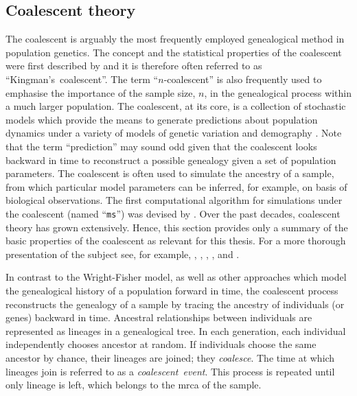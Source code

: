 %
\subsection{Coalescent theory}
\label{sec:coalescent}
%


The coalescent is arguably the most frequently employed genealogical method in population genetics.
The concept and the statistical properties of the coalescent were first described by \citet{Kingman:1982x,Kingman:1982gu,Kingman:1982uj} and it is therefore often referred to as ``Kingman's~coalescent''.
The term ``$n$-coalescent'' is also frequently used to emphasise the importance of the sample size, $n$, in the genealogical process within a much larger population.
The coalescent, at its core, is a collection of stochastic models which provide the means to generate predictions about population dynamics under a variety of models of genetic variation and demography \citep{wakeley2008}.
Note that the term ``prediction'' may sound odd given that the coalescent looks backward in time to reconstruct a possible genealogy given a set of population parameters.
The coalescent is often used to simulate the ancestry of a sample, from which particular model parameters can be inferred, for example, on basis of biological observations.
The first computational algorithm for simulations under the coalescent (named ``\texttt{ms}'') was devised by \citet{Hudson:1990vob}.
Over the past decades, coalescent theory has grown extensively.
Hence, this section provides only a summary of the basic properties of the coalescent as relevant for this thesis.
For a more thorough presentation of the subject see, for example, \citet{Fu:1999fj}, \citet{neuhauser2001}, \citet{nordborg2001coalescent}, \citet{hein2004gene}, and \citet{wakeley2008}.


In contrast to the Wright-Fisher model, as well as other approaches which model the genealogical history of a population forward in time, the coalescent process reconstructs the genealogy of a sample by tracing the ancestry of individuals (or genes) backward in time.
Ancestral relationships between individuals are represented as lineages in a genealogical tree.
In each generation, each individual independently chooses  ancestor at random.
If  individuals choose the same ancestor by chance, their lineages are joined; \ie they \emph{coalesce}.
The time at which  lineages join is referred to as a \emph{coalescent~event}.
This process is repeated until only  lineage is left, which belongs to the \gls{mrca} of the sample.

